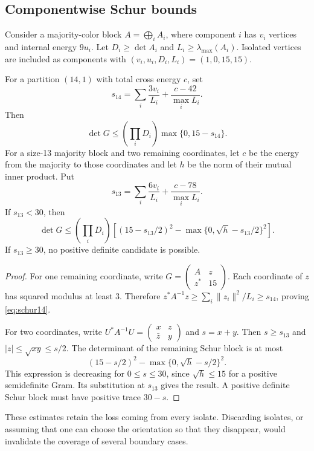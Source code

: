 \subsection{Componentwise Schur bounds}
Consider a majority-color block $A=\bigoplus_i A_i$, where component $i$ has $v_i$ vertices and internal energy $9u_i$. Let $D_i\ge\det A_i$ and $L_i\ge\lambda_{\max}(A_i)$. Isolated vertices are included as components with $(v_i,u_i,D_i,L_i)=(1,0,15,15)$.

\begin{lemma}\label{lem:schur}
For a partition $(14,1)$ with total cross energy $c$, set
\[
 s_{14}=\sum_i\frac{3v_i}{L_i}+\frac{c-42}{\max_iL_i}.
\]
Then
\begin{equation}\label{eq:schur14}
 \det G\le\left(\prod_iD_i\right)\max\{0,15-s_{14}\}.
\end{equation}
For a size-13 majority block and two remaining coordinates, let $c$ be the energy from the majority to those coordinates and let $h$ be the norm of their mutual inner product. Put
\[
 s_{13}=\sum_i\frac{6v_i}{L_i}+\frac{c-78}{\max_iL_i}.
\]
If $s_{13}<30$, then
\begin{equation}\label{eq:schur13}
 \det G\le\left(\prod_iD_i\right)
 \left[(15-s_{13}/2)^2-
       \max\{0,\sqrt h-s_{13}/2\}^2\right].
\end{equation}
If $s_{13}\ge30$, no positive definite candidate is possible.
\end{lemma}
\begin{proof}
For one remaining coordinate, write $G=\left(\begin{smallmatrix}A&z\\z^*&15\end{smallmatrix}\right)$. Each coordinate of $z$ has squared modulus at least 3. Therefore
$z^*A^{-1}z\ge\sum_i\|z_i\|^2/L_i\ge s_{14}$, proving \eqref{eq:schur14}.

For two coordinates, write $U^*A^{-1}U=\left(\begin{smallmatrix}x&z\\\bar z&y\end{smallmatrix}\right)$ and $s=x+y$. Then $s\ge s_{13}$ and $|z|\le\sqrt{xy}\le s/2$. The determinant of the remaining Schur block is at most
\[
 (15-s/2)^2-\max\{0,\sqrt h-s/2\}^2.
\]
This expression is decreasing for $0\le s\le30$, since $\sqrt h\le15$ for a positive semidefinite Gram. Its substitution at $s_{13}$ gives the result. A positive definite Schur block must have positive trace $30-s$.
\end{proof}
These estimates retain the loss coming from every isolate. Discarding isolates, or assuming that one can choose the orientation so that they disappear, would invalidate the coverage of several boundary cases.

